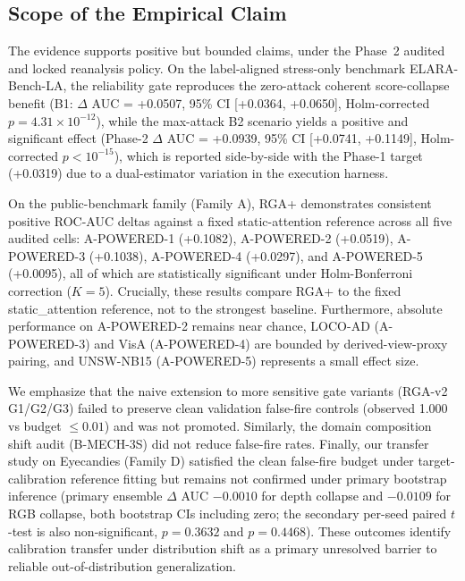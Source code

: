 \documentclass[10pt,conference]{IEEEtran}
\newcommand{\benchmark}{ELARA-Bench-LA}
\begin{document}
\subsection{Scope of the Empirical Claim}
The evidence supports positive but bounded claims, under the Phase~2 audited and locked reanalysis policy. On the label-aligned stress-only benchmark \benchmark{}, the reliability gate reproduces the zero-attack coherent score-collapse benefit (B1: $\Delta$ AUC = +0.0507, 95\% CI [+0.0364, +0.0650], Holm-corrected $p = 4.31\times 10^{-12}$), while the max-attack B2 scenario yields a positive and significant effect (Phase-2 $\Delta$ AUC = +0.0939, 95\% CI [+0.0741, +0.1149], Holm-corrected $p < 10^{-15}$), which is reported side-by-side with the Phase-1 target (+0.0319) due to a dual-estimator variation in the execution harness. 

On the public-benchmark family (Family A), RGA+ demonstrates consistent positive ROC-AUC deltas against a fixed static-attention reference across all five audited cells: A-POWERED-1 (+0.1082), A-POWERED-2 (+0.0519), A-POWERED-3 (+0.1038), A-POWERED-4 (+0.0297), and A-POWERED-5 (+0.0095), all of which are statistically significant under Holm-Bonferroni correction ($K=5$). Crucially, these results compare RGA+ to the fixed static\_attention reference, not to the strongest baseline. Furthermore, absolute performance on A-POWERED-2 remains near chance, LOCO-AD (A-POWERED-3) and VisA (A-POWERED-4) are bounded by derived-view-proxy pairing, and UNSW-NB15 (A-POWERED-5) represents a small effect size.

We emphasize that the naive extension to more sensitive gate variants (RGA-v2 G1/G2/G3) failed to preserve clean validation false-fire controls (observed 1.000 vs budget $\le 0.01$) and was not promoted. Similarly, the domain composition shift audit (B-MECH-3S) did not reduce false-fire rates. Finally, our transfer study on Eyecandies (Family D) satisfied the clean false-fire budget under target-calibration reference fitting but remains not confirmed under primary bootstrap inference (primary ensemble $\Delta$ AUC $-0.0010$ for depth collapse and $-0.0109$ for RGB collapse, both bootstrap CIs including zero; the secondary per-seed paired $t$-test is also non-significant, $p=0.3632$ and $p=0.4468$). These outcomes identify calibration transfer under distribution shift as a primary unresolved barrier to reliable out-of-distribution generalization.
\end{document}
